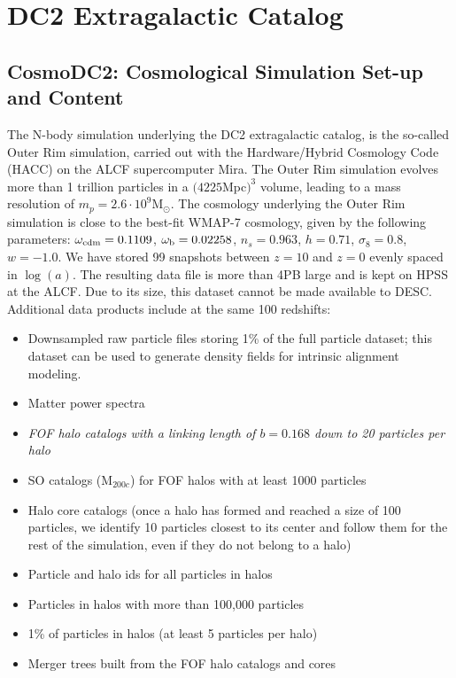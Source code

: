 \documentclass[preprint,times]{aastex61}
\begin{document}
\section{DC2 Extragalactic Catalog}

\subsection{CosmoDC2: Cosmological Simulation Set-up and Content}
\label{cosmoDC2}

The N-body simulation underlying the DC2 extragalactic catalog, is the so-called Outer Rim simulation, carried
out with the Hardware/Hybrid Cosmology Code (HACC) on the ALCF supercomputer Mira. The Outer Rim simulation evolves more than 1 trillion particles in a $(4225$Mpc$)^3$ volume, leading to a mass resolution of $m_p=2.6\cdot 10^9$M$_\odot$. The cosmology underlying the Outer Rim simulation is close to the best-fit WMAP-7 cosmology, given by the following parameters: $\omega_{\rm cdm}=0.1109$, $\omega_{\rm b}=0.02258$,
$n_s=0.963$, $h=0.71$, $\sigma_8=0.8$, $w=-1.0$. We have stored 99 snapshots between $z=10$ and $z=0$ evenly spaced in $\log (a)$. The resulting data file is more than 4PB large and is kept on HPSS at the ALCF. Due to its size, this dataset cannot be made available to DESC. Additional data products include at the same 100 redshifts:
\begin{itemize}
\item Downsampled raw particle files storing 1\% of the full particle dataset; this dataset can be used to generate density fields for intrinsic alignment modeling. 
\item Matter power spectra
\item {\it FOF halo catalogs with a linking length of $b=0.168$ down to 20 particles per halo}
\item SO catalogs (M$_{200c}$) for FOF halos with at least 1000 particles
\item Halo core catalogs (once a halo has formed and reached a size of 100 particles, we identify 10 particles closest to its center and follow them for the rest of the simulation, even if they do not belong to a halo)
\item Particle and halo ids for all particles in halos
\item Particles in halos with more than 100,000 particles
\item 1\% of particles in halos (at least 5 particles per halo)
\item Merger trees built from the FOF halo catalogs and cores
\end{itemize}
\end{document}
